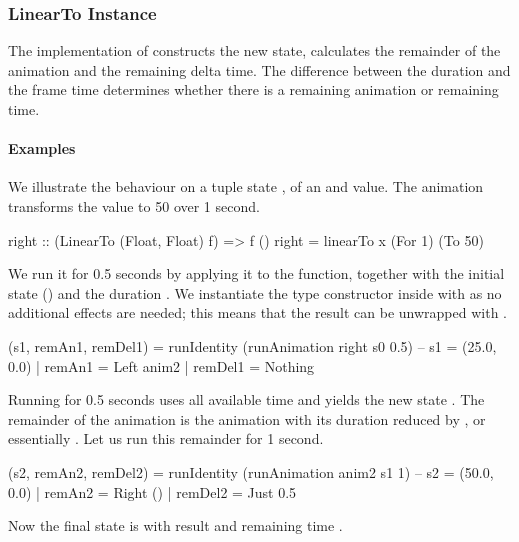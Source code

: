 \subsubsection{LinearTo Instance}

The  implementation of  constructs
the new state, calculates the remainder of the animation and the remaining delta time. The difference between the  duration and the
frame time determines whether there is a remaining  animation or
remaining time.

\paragraph{Examples}

We illustrate the behaviour on a tuple state , of an  and  value.
The  animation transforms the  value to 50 over 1 second.

\begin{code}
right :: (LinearTo (Float, Float) f) => f ()
right = linearTo x (For 1) (To 50)
\end{code}

We run it for 0.5 seconds by applying it to the  function,
together with the initial state () and the duration . We instantiate the  type constructor
inside  with  as no additional effects are
needed; this means that the result can be unwrapped with
.

\begin{code}
(s1, remAn1, remDel1) = runIdentity (runAnimation right s0 0.5)
-- s1 = (25.0, 0.0) | remAn1 = Left anim2 | remDel1 = Nothing
\end{code}

Running  for 0.5 seconds uses all available time and yields the new state
. The remainder of
the animation is the  animation with its duration reduced by , or essentially . Let us run this
remainder for 1 second.

\begin{code}
(s2, remAn2, remDel2) = runIdentity (runAnimation anim2 s1 1)
-- s2 = (50.0, 0.0) | remAn2 = Right () | remDel2 = Just 0.5
\end{code}

Now the final state is  with result \hs{()} and remaining time .

